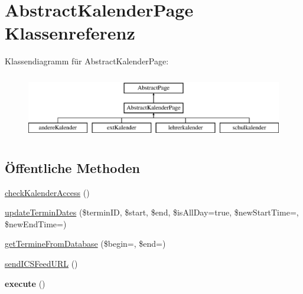 \hypertarget{class_abstract_kalender_page}{}\section{Abstract\+Kalender\+Page Klassenreferenz}
\label{class_abstract_kalender_page}
Klassendiagramm für Abstract\+Kalender\+Page\+:\begin{figure}[H]
\begin{center}
\leavevmode
\includegraphics[height=2.857143cm]{class_abstract_kalender_page}
\end{center}
\end{figure}
\subsection*{Öffentliche Methoden}
\begin{DoxyCompactItemize}
\item 
\mbox{\hyperlink{class_abstract_kalender_page_a6e5d41527d29eddb9b2c3f846bca69d1}{check\+Kalender\+Access}} ()
\item 
\mbox{\hyperlink{class_abstract_kalender_page_afd9823119959b5f77a833e7666510f4b}{update\+Termin\+Dates}} (\$termin\+ID, \$start, \$end, \$is\+All\+Day=true, \$new\+Start\+Time=\textquotesingle{}\textquotesingle{}, \$new\+End\+Time=\textquotesingle{}\textquotesingle{})
\item 
\mbox{\hyperlink{class_abstract_kalender_page_a9ca1f9b4dd18edaef203ee9d5c20f2cd}{get\+Termine\+From\+Database}} (\$begin=\textquotesingle{}\textquotesingle{}, \$end=\textquotesingle{}\textquotesingle{})
\item 
\mbox{\hyperlink{class_abstract_kalender_page_ae95ebf53fc82e90beccfb6d81045331f}{send\+I\+C\+S\+Feed\+U\+RL}} ()
\item 
\mbox{\label{class_abstract_kalender_page_a10005f1b3468980ea3fe3ba479e16ca2}} 
{\bfseries execute} ()
\end{DoxyCompactItemize}
